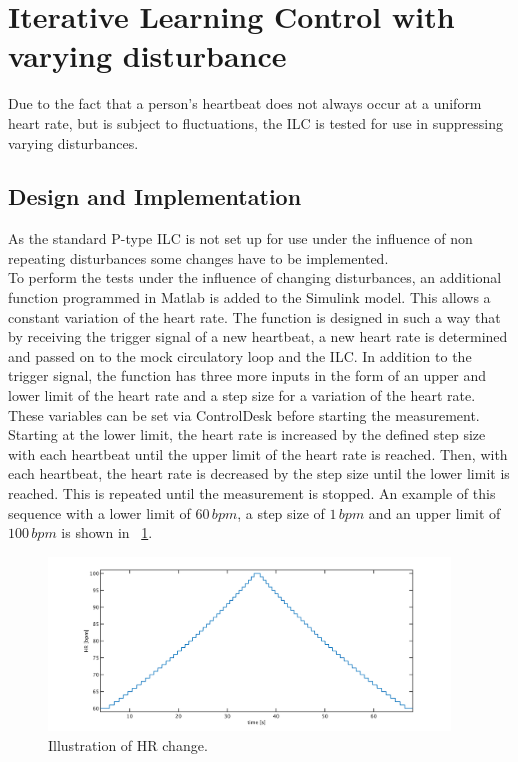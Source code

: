 \section{Iterative Learning Control with varying disturbance}
Due to the fact that a person's heartbeat does not always occur at a uniform heart rate, but is subject to fluctuations, the ILC is tested for use in suppressing varying disturbances.

\subsection{Design and Implementation}
As the standard P-type ILC is not set up for use under the influence of non repeating disturbances some changes have to be implemented.
\\To perform the tests under the influence of changing disturbances, an additional function programmed in Matlab is added to the Simulink model. This allows a constant variation of the heart rate. The function is designed in such a way that by receiving the trigger signal of a new heartbeat, a new heart rate is determined and passed on to the mock circulatory loop and the ILC. In addition to the trigger signal, the function has three more inputs in the form of an upper and lower limit of the heart rate and a step size for a variation of the heart rate. These variables can be set via ControlDesk before starting the measurement.
Starting at the lower limit, the heart rate is increased by the defined step size with each heartbeat until the upper limit of the heart rate is reached. Then, with each heartbeat, the heart rate is decreased by the step size until the lower limit is reached. This is repeated until the measurement is stopped. An example of this sequence with a lower limit of $60\, bpm$, a step size of $1\, bpm$ and an upper limit of $100\, bpm$ is shown in \figurename~\ref{fig:hr_increase}.
\begin{figure}[ht!]
  \centering
  \includegraphics[width=0.95\textwidth]{images/chapt_5/ILC/hr_increase.pdf}
  \caption[Illustration of HR change]{Illustration of HR change.}
  \label{fig:hr_increase}
\end{figure}


